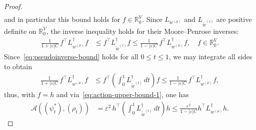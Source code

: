 \documentclass[10pt,a4paper]{amsart}
\begin{document}
\begin{proof}
\begin{align*}
        \end{align*}
    and in particular this bound holds for $f\in\mathbb{R}^{V}_0$. Since $L_{w^{(\mu)}}$ and $L_{\widetilde{w}^{(t)}}$ are positive definite on $\mathbb{R}^{V}_0$, the inverse inequality holds for their Moore--Penrose inverses:
        \begin{align}\label{eq:pseudoinverse-bound}
            \frac{1}{1 + |\varepsilon| C} \, f^\top L_{w^{(\mu)}}^{\dagger} f &\leq f^\top L_{\widetilde{w}^{(t)}}^{\dagger} f \leq \frac{1}{1 - |\varepsilon| C} \, f^\top L_{w^{(\mu)}}^{\dagger} f,\quad f\in\mathbb{R}^{V}_0.
        \end{align}
    Since~\cref{eq:pseudoinverse-bound} holds for all $0\le t\le 1$, we may integrate all sides to obtain
        \begin{align*}
            \frac{1}{1 + |\varepsilon| C} \, f^\top L_{w^{(\mu)}}^{\dagger} f &\leq f^\top \left( \int_0^{1} L_{\widetilde{w}^{(t)}}^{\dagger} \, dt \right) f \leq \frac{1}{1 - |\varepsilon| C} \, f^\top L_{w^{(\mu)}}^{\dagger} f,
        \end{align*}
    thus, with $f=h$ and via~\cref{eq:action-upper-bound-1}, one has
        \begin{align}\label{eq:pseudoinverse-bound-2}
            \mathcal{A}((\psi_t^\ast), (\rho_t)) &= \varepsilon^2 \, h^\top \left( \int_0^{1} L_{\widetilde{w}^{(t)}}^{\dagger} \, dt \right) h \leq \frac{\varepsilon^2}{1-|\varepsilon| C} h^\top L_{w^{(\mu)}}^{\dagger} h.
        \end{align}
    

\end{proof}
\end{document}
